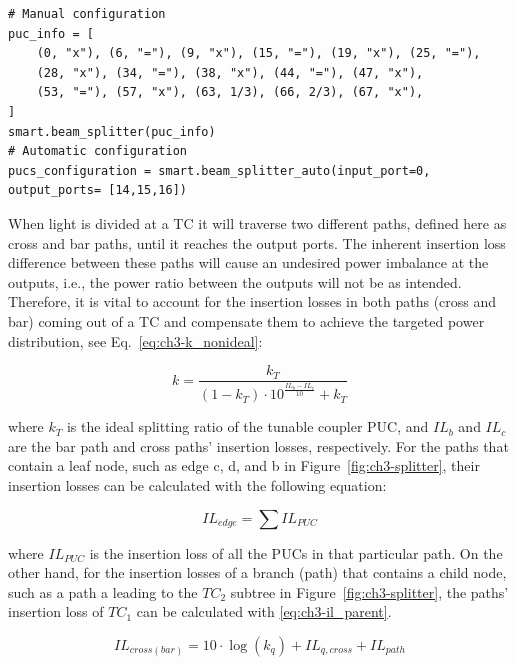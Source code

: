 \begin{lstlisting}[caption={Implementation of manual and automatic beamsplitters using the first-generation Smartlight API}, label=lst:ch3-splitter]
# Manual configuration
puc_info = [
    (0, "x"), (6, "="), (9, "x"), (15, "="), (19, "x"), (25, "="),
    (28, "x"), (34, "="), (38, "x"), (44, "="), (47, "x"),
    (53, "="), (57, "x"), (63, 1/3), (66, 2/3), (67, "x"),
]
smart.beam_splitter(puc_info)
# Automatic configuration
pucs_configuration = smart.beam_splitter_auto(input_port=0, output_ports= [14,15,16]) 
\end{lstlisting}

When light is divided at a TC it will traverse two different paths, defined here as cross and bar paths, until it reaches the output ports.
The inherent insertion loss difference between these paths will cause an undesired power imbalance at the outputs, i.e., the power ratio between the outputs will not be as intended.
Therefore, it is vital to account for the insertion losses in both paths (cross and bar) coming out of a TC and compensate them to achieve the targeted power distribution, see Eq.~\eqref{eq:ch3-k_nonideal}:

\begin{equation}
	k = \frac{k_T}{(1 - k_T) \cdot 10^{\frac{IL_b - IL_c}{10}} + k_T}
	\label{eq:ch3-k_nonideal}
\end{equation}

where \(k_T\) is the ideal splitting ratio of the tunable coupler PUC, and \(IL_b\) and \(IL_c\) are the bar path and cross paths' insertion losses, respectively.
For the paths that contain a leaf node, such as edge c, d, and b in Figure~\ref{fig:ch3-splitter}, their insertion losses can be calculated with the following equation:

\begin{equation}
	IL_{edge} = \sum IL_{PUC} \label{eq:ch3-il_leaf} \end{equation}

where \(IL_{PUC}\) is the insertion loss of all the PUCs in that particular path.
On the other hand, for the insertion losses of a branch (path) that contains a child node, such as a path a leading to the $TC_2$ subtree in Figure~\ref{fig:ch3-splitter}, the paths’ insertion loss of $TC_1$ can be calculated with \eqref{eq:ch3-il_parent}.

\begin{equation}
	IL_{cross(bar)} = 10 \cdot \log \left( k_q \right) + IL_{q,cross} + IL_{path} \label{eq:ch3-il_parent} \end{equation}


